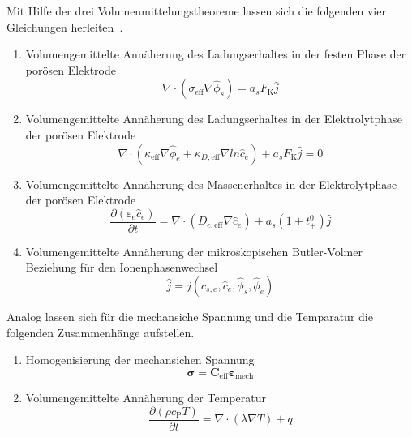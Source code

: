 Mit Hilfe der drei Volumenmittelungstheoreme lassen sich die folgenden vier Gleichungen herleiten~\cite{Doyle1995}.
\begin{enumerate}
    \item Volumengemittelte Annäherung des Ladungserhaltes in der festen Phase der porösen Elektrode
    \begin{equation}
        \nabla \cdot \left(\sigma_{\text{eff}} \nabla \hat{\phi}_{s} \right) = a_s F_{\text{K}} \hat{j}
    \end{equation}
    \item Volumengemittelte Annäherung des Ladungserhaltes in der Elektrolytphase der porösen Elektrode
    \begin{equation}
        \nabla \cdot \left(\kappa_{\text{eff}} \nabla \hat{\phi}_e + \kappa_{D, \text{eff}} \nabla ln \hat{c}_e\right) + a_s F_{\text{K}} \hat{j} = 0
    \end{equation}
    \item Volumengemittelte Annäherung des Massenerhaltes in der Elektrolytphase der porösen Elektrode
    \begin{equation}
        \frac{\partial \left(\varepsilon_e \hat{c}_e \right)}{\partial t} = \nabla \cdot \left(D_{e,\text{eff}}\nabla\hat{c}_e\right) + a_s (1+t^0_+) \hat{j}
    \end{equation}
    \item Volumengemittelte Annäherung der mikroskopischen Butler-Volmer Beziehung für den Ionenphasenwechsel
    \begin{equation}
        \hat{j} = j(c_{s,e},\hat{c}_e,\hat{\phi}_s,\hat{\phi}_e)
    \end{equation}
\end{enumerate}

Analog lassen sich für die mechansiche Spannung und die Temparatur die folgenden Zusammenhänge aufstellen.
\begin{enumerate}
    \item Homogenisierung der mechansichen Spannung
    \begin{equation}
    \boldsymbol{\sigma} = \boldsymbol{C}_{\text{eff}} \boldsymbol{\varepsilon}_{\text{mech}} 
    \end{equation}
    \item Volumengemittelte Annäherung der Temperatur
    \begin{equation}
        \frac{\partial (\rho c_{\text{P}} T)}{\partial t} = \nabla \cdot (\lambda \nabla T) + q
    \end{equation}
\end{enumerate}


